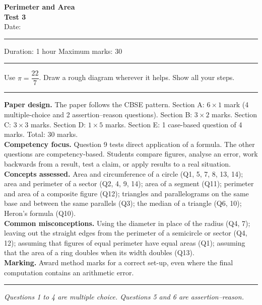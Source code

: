 \documentclass[11pt,a4paper]{article}
\newcommand{\nl}{\\[3pt]}
\newcommand{\sect}[1]{\par\medskip\Needspace{15\baselineskip}{\small\bfseries #1}\par\nopagebreak\smallskip}
\begin{document}
\begin{center}
{\Large\bfseries Perimeter and Area}\\[3pt]
{\large\bfseries Test 3}\\[5pt]
Date: \rule{3cm}{0.4pt} \quad Duration: 1 hour \quad Maximum marks: 30
\end{center}
\vspace{-6pt}
\noindent\rule{\linewidth}{0.6pt}\par
\vspace{3pt}
{\centering\small Use $\pi=\dfrac{22}{7}$. Draw a rough diagram wherever it helps. Show all your steps.\par}
\ifteacher
\vspace{4pt}
{\color{thinrule}\noindent\rule{\linewidth}{0.4pt}}\par
\vspace{4pt}
{\small\color{muted}\linespread{1.15}\selectfont
\textbf{Paper design.} The paper follows the CBSE pattern. Section A: $6\times1$ mark (4 multiple-choice and 2 assertion--reason questions). Section B: $3\times2$ marks. Section C: $3\times3$ marks. Section D: $1\times5$ marks. Section E: 1 case-based question of 4 marks. Total: 30 marks.\nl
\textbf{Competency focus.} Question 9 tests direct application of a formula. The other questions are competency-based. Students compare figures, analyse an error, work backwards from a result, test a claim, or apply results to a real situation.\nl
\textbf{Concepts assessed.} Area and circumference of a circle (Q1, 5, 7, 8, 13, 14); area and perimeter of a sector (Q2, 4, 9, 14); area of a segment (Q11); perimeter and area of a composite figure (Q12); triangles and parallelograms on the same base and between the same parallels (Q3); the median of a triangle (Q6, 10); Heron's formula (Q10).\nl
\textbf{Common misconceptions.} Using the diameter in place of the radius (Q4, 7); leaving out the straight edges from the perimeter of a semicircle or sector (Q4, 12); assuming that figures of equal perimeter have equal areas (Q1); assuming that the area of a ring doubles when its width doubles (Q13).\nl
\textbf{Marking.} Award method marks for a correct set-up, even where the final computation contains an arithmetic error.\par}
\vspace{4pt}
{\color{thinrule}\noindent\rule{\linewidth}{0.4pt}}\par
\vspace{3pt}
\fi

\sect{Section A (1 mark each)}
{\small\itshape Questions 1 to 4 are multiple choice. Questions 5 and 6 are assertion--reason.\par}
\end{document}
